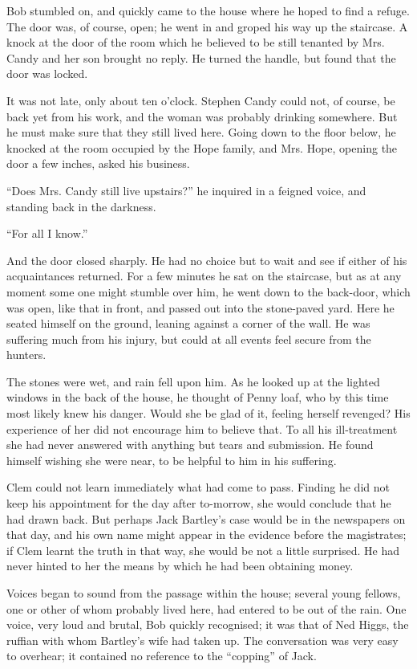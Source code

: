 Bob stumbled on, and quickly came to the house where he hoped to find a
refuge. The door was, of course, open; he went in and groped his way up
the staircase. A knock at the door of the room which he believed to be
still tenanted by Mrs. Candy and her son brought no reply. He turned the
handle, but found that the door was locked.

It was not late, only about ten o'clock. Stephen Candy could not, of
course, be back yet from his work, and the woman was probably drinking
somewhere. But he must make sure that they still lived here. Going down
to the floor below, he knocked at the room occupied by the Hope family,
and Mrs. Hope, opening the door a few inches, asked his business.

``Does Mrs. Candy still live upstairs?'' he inquired in a feigned voice,
and standing back in the darkness.

{\protect\hypertarget{196}{}{}}``For all I know.''

And the door closed sharply. He had no choice but to wait and see if
either of his acquaintances returned. For a few minutes he sat on the
staircase, but as at any moment some one might stumble over him, he went
down to the back-door, which was open, like that in front, and passed
out into the stone-paved yard. Here he seated himself on the ground,
leaning against a corner of the wall. He was suffering much from his
injury, but could at all events feel secure from the hunters.

The stones were wet, and rain fell upon him. As he looked up at the
lighted windows in the back of the house, he thought of Penny loaf, who
by this time most likely knew his danger. Would she be glad of it,
feeling herself revenged? His experience of her did not encourage him to
believe that. To all his ill-treatment she had never answered with
anything but tears and submission. He found himself wishing she were
near, to be helpful to him in his suffering.

Clem could not learn immediately what had come to pass. Finding he did
not keep his {\protect\hypertarget{197}{}{}}appointment for the day
after to-morrow, she would conclude that he had drawn back. But perhaps
Jack Bartley's case would be in the newspapers on that day, and his own
name might appear in the evidence before the magistrates; if Clem learnt
the truth in that way, she would be not a little surprised. He had never
hinted to her the means by which he had been obtaining money.

Voices began to sound from the passage within the house; several young
fellows, one or other of whom probably lived here, had entered to be out
of the rain. One voice, very loud and brutal, Bob quickly recognised; it
was that of Ned Higgs, the ruffian with whom Bartley's wife had taken
up. The conversation was very easy to overhear; it contained no
reference to the ``copping'' of Jack.

